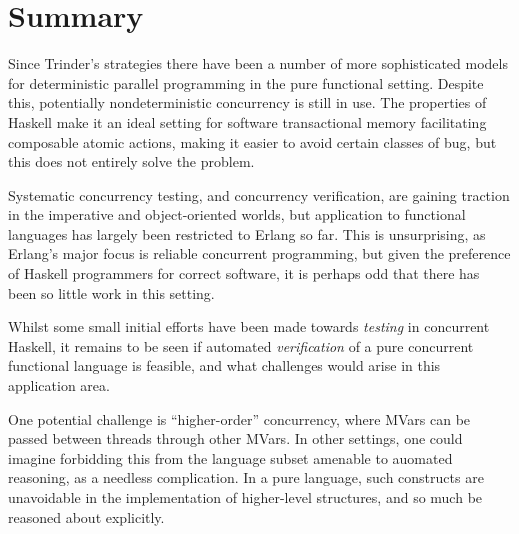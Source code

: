 \section{Summary}
\label{sec:litrev-summary}

Since Trinder's strategies there have been a number of more
sophisticated models for deterministic parallel programming in the
pure functional setting. Despite this, potentially nondeterministic
concurrency is still in use. The properties of Haskell make it an
ideal setting for software transactional memory facilitating
composable atomic actions, making it easier to avoid certain classes
of bug, but this does not entirely solve the problem.

Systematic concurrency testing, and concurrency verification, are
gaining traction in the imperative and object-oriented worlds, but
application to functional languages has largely been restricted to
Erlang so far. This is unsurprising, as Erlang's major focus is
reliable concurrent programming, but given the preference of Haskell
programmers for correct software, it is perhaps odd that there has
been so little work in this setting.

Whilst some small initial efforts have been made towards
\textit{testing} in concurrent Haskell, it remains to be seen if
automated \textit{verification} of a pure concurrent functional
language is feasible, and what challenges would arise in this
application area.

One potential challenge is ``higher-order'' concurrency, where MVars
can be passed between threads through other MVars. In other settings,
one could imagine forbidding this from the language subset amenable to
auomated reasoning, as a needless complication. In a pure language,
such constructs are unavoidable in the implementation of higher-level
structures, and so much be reasoned about explicitly.
